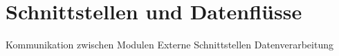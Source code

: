 \section{Schnittstellen und Datenflüsse} 
Kommunikation zwischen Modulen
Externe Schnittstellen
Datenverarbeitung